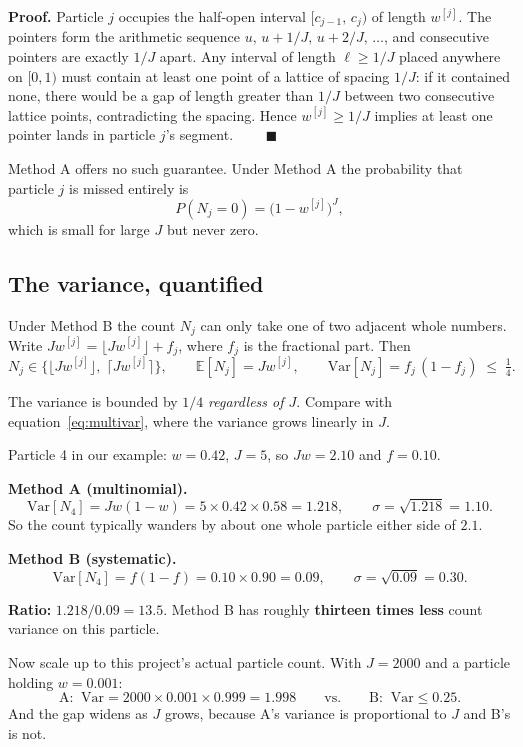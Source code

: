 \documentclass[11pt,a4paper]{report}
\begin{document}
\noindent\textbf{Proof.} Particle $j$ occupies the half-open interval
$[c_{j-1},\, c_j)$ of length $w^{[j]}$. The pointers form the arithmetic
sequence $u,\, u + 1/J,\, u + 2/J,\, \ldots$, and consecutive pointers are
exactly $1/J$ apart. Any interval of length $\ell \ge 1/J$ placed anywhere on
$[0,1)$ must contain at least one point of a lattice of spacing $1/J$: if it
contained none, there would be a gap of length greater than $1/J$ between two
consecutive lattice points, contradicting the spacing. Hence
$w^{[j]} \ge 1/J$ implies at least one pointer lands in particle $j$'s
segment. $\qquad\blacksquare$

Method A offers no such guarantee. Under Method A the probability that
particle $j$ is missed entirely is
\[
P(N_j = 0) = \bigl(1 - w^{[j]}\bigr)^{J},
\]
which is small for large $J$ but never zero.

\subsection{The variance, quantified}

Under Method B the count $N_j$ can only take one of two adjacent whole
numbers. Write $J w^{[j]} = \lfloor J w^{[j]} \rfloor + f_j$, where $f_j$ is
the fractional part. Then
\begin{equation}
N_j \in \bigl\{\lfloor J w^{[j]} \rfloor,\; \lceil J w^{[j]} \rceil \bigr\},
\qquad
\mathbb{E}[N_j] = J w^{[j]},
\qquad
\mathrm{Var}[N_j] = f_j\,(1 - f_j) \;\le\; \tfrac{1}{4}.
\label{eq:susvar}
\end{equation}

The variance is bounded by $1/4$ \emph{regardless of $J$}. Compare with
equation~\eqref{eq:multivar}, where the variance grows linearly in $J$.

\begin{handbox}
Particle 4 in our example: $w = 0.42$, $J = 5$, so $Jw = 2.10$ and $f = 0.10$.

\smallskip
\textbf{Method A (multinomial).}
\[
\mathrm{Var}[N_4] = J w (1-w) = 5 \times 0.42 \times 0.58 = 1.218,
\qquad \sigma = \sqrt{1.218} = 1.10 .
\]
So the count typically wanders by about one whole particle either side of
$2.1$.

\smallskip
\textbf{Method B (systematic).}
\[
\mathrm{Var}[N_4] = f(1-f) = 0.10 \times 0.90 = 0.09,
\qquad \sigma = \sqrt{0.09} = 0.30 .
\]

\smallskip
\textbf{Ratio:} $1.218 / 0.09 = 13.5$. Method B has roughly \textbf{thirteen
times less} count variance on this particle.

\smallskip
Now scale up to this project's actual particle count. With $J = 2000$ and a
particle holding $w = 0.001$:
\[
\text{A:}\;\; \mathrm{Var} = 2000 \times 0.001 \times 0.999 = 1.998
\qquad\text{vs.}\qquad
\text{B:}\;\; \mathrm{Var} \le 0.25 .
\]
And the gap widens as $J$ grows, because A's variance is proportional to $J$
and B's is not.
\end{handbox}
\end{document}
